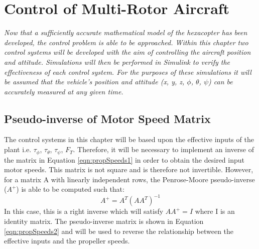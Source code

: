 
\chapter{Control of Multi-Rotor Aircraft}\label{chapter:control}

\textit{Now that a sufficiently accurate mathematical model of the hexacopter has been developed, the control problem is able to be approached. Within this chapter two control systems will be developed with the aim of controlling the aircraft position and attitude. Simulations will then be performed in Simulink to verify the effectiveness of each control system. For the purposes of these simulations it will be assumed that the vehicle's position and attitude (x, y, z, $\phi$, $\theta$, $\psi$) can be accurately measured at any given time.} 

\section{Pseudo-inverse of Motor Speed Matrix}
The control systems in this chapter will be based upon the effective inputs of the plant i.e. $\tau_{\phi}$, $\tau_{\theta}$, $\tau_{\psi}$, $F_{T}$. Therefore, it will be necessary to implement an inverse of the matrix in Equation \ref{eqn:propSpeeds1} in order to obtain the desired input motor speeds. This matrix is not square and is therefore not invertible. However, for a matrix A with linearly independent rows, the Penrose-Moore pseudo-inverse ($A^{+}$) is able to be computed such  that: 
\[A^{+}= A^{T}(AA^{T})^{-1}\]
In this case, this is a right inverse which will satisfy \(AA^{+}=I\) where I is an identity matrix. The pseudo-inverse matrix is shown in Equation \ref{eqn:propSpeeds2} and will be used to reverse the relationship between the effective inputs and the propeller speeds.
